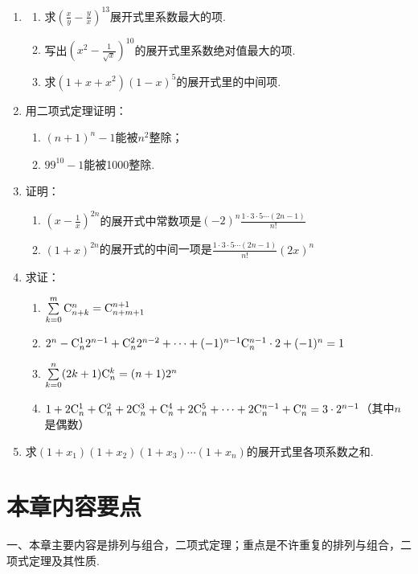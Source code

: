 \begin{enumerate}
\item \begin{enumerate}[(1)]
    \item 求$\left(\frac{x}{y}-\frac{y}{x}\right)^{13}$展开式里系数最大的项.
    \item 写出$\left(x^2-\frac{1}{\sqrt{x}}\right)^{10}$的展开式里系数绝对值最大的项.
    \item 求$(1+x+x^2)(1-x)^5$的展开式里的中间项.
\end{enumerate}

\item 用二项式定理证明：
\begin{enumerate}[(1)]
    \item $(n+1)^{n}-1$能被$n^2$整除；
    \item $99^{10}-1$能被1000整除.
\end{enumerate}

\item 证明：
\begin{enumerate}[(1)]
    \item $\left(x-\frac{1}{x}\right)^{2n}$的展开式中常数项是$(-2)^n\frac{1\cdot 3\cdot 5\cdots (2n-1)}{n!}$
    \item $(1+x)^{2n}$的展开式的中间一项是$\frac{1\cdot 3\cdot 5\cdots (2n-1)}{n!}(2x)^n$
\end{enumerate}

\item 求证：
\begin{enumerate}[(1)]
    \item $\sum\limits^m_{k=0}{\rm C}^{n}_{n+k}={\rm C}^{n+1}_{n+m+1}$
    \item $2^n-{\rm C}^{1}_{n}2^{n-1}+{\rm C}^{2}_{n}2^{n-2}+\cdots+(-1)^{n-1}{\rm C}^{n-1}_{n}\cdot 2+(-1)^n=1$
    \item $\sum\limits^n_{k=0}(2k+1){\rm C}^{k}_{n}=(n+1)2^n$
    \item $1+2{\rm C}^{1}_{n}+{\rm C}^{2}_{n}+2{\rm C}^{3}_{n}+{\rm C}^{4}_{n}+2{\rm C}^{5}_{n}+\cdots +2{\rm C}^{n-1}_{n}+{\rm C}^{n}_{n}=3\cdot 2^{n-1}$（其中$n$是偶数）
\end{enumerate}
\item 求$(1+x_1)(1+x_2)(1+x_3)\cdots(1+x_n)$的展开式里各项系数之和.
\end{enumerate}


\section*{本章内容要点}
一、本章主要内容是排列与组合，二项式定理；重点是不许重复的排列与组合，二项式定理及其性质.

